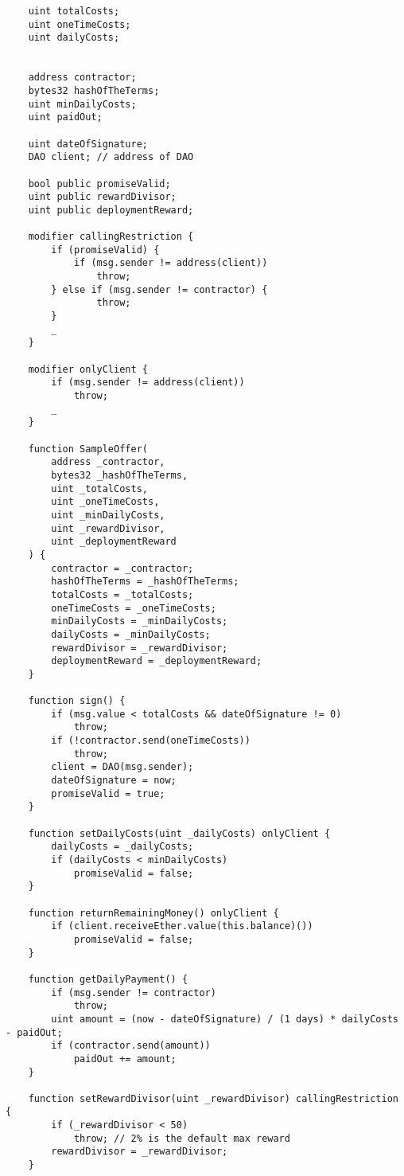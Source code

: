 \documentclass[9pt,oneside]{amsart}
\begin{document}
\begin{appendix}
\begin{verbatim}
    uint totalCosts;
    uint oneTimeCosts;
    uint dailyCosts;


    address contractor;
    bytes32 hashOfTheTerms;
    uint minDailyCosts;
    uint paidOut;

    uint dateOfSignature;
    DAO client; // address of DAO

    bool public promiseValid;
    uint public rewardDivisor;
    uint public deploymentReward;

    modifier callingRestriction {
        if (promiseValid) {
            if (msg.sender != address(client))
                throw;
        } else if (msg.sender != contractor) {
                throw;
        }
        _
    }

    modifier onlyClient {
        if (msg.sender != address(client))
            throw;
        _
    }

    function SampleOffer(
        address _contractor,
        bytes32 _hashOfTheTerms,
        uint _totalCosts,
        uint _oneTimeCosts,
        uint _minDailyCosts,
        uint _rewardDivisor,
        uint _deploymentReward
    ) {
        contractor = _contractor;
        hashOfTheTerms = _hashOfTheTerms;
        totalCosts = _totalCosts;
        oneTimeCosts = _oneTimeCosts;
        minDailyCosts = _minDailyCosts;
        dailyCosts = _minDailyCosts;
        rewardDivisor = _rewardDivisor;
        deploymentReward = _deploymentReward;
    }

    function sign() {
        if (msg.value < totalCosts && dateOfSignature != 0)
            throw;
        if (!contractor.send(oneTimeCosts))
            throw;
        client = DAO(msg.sender);
        dateOfSignature = now;
        promiseValid = true;
    }

    function setDailyCosts(uint _dailyCosts) onlyClient {
        dailyCosts = _dailyCosts;
        if (dailyCosts < minDailyCosts)
            promiseValid = false;
    }

    function returnRemainingMoney() onlyClient {
        if (client.receiveEther.value(this.balance)())
            promiseValid = false;
    }

    function getDailyPayment() {
        if (msg.sender != contractor)
            throw;
        uint amount = (now - dateOfSignature) / (1 days) * dailyCosts - paidOut;
        if (contractor.send(amount))
            paidOut += amount;
    }

    function setRewardDivisor(uint _rewardDivisor) callingRestriction {
        if (_rewardDivisor < 50)
            throw; // 2% is the default max reward
        rewardDivisor = _rewardDivisor;
    }


\end{verbatim}
\end{appendix}
\end{document}
